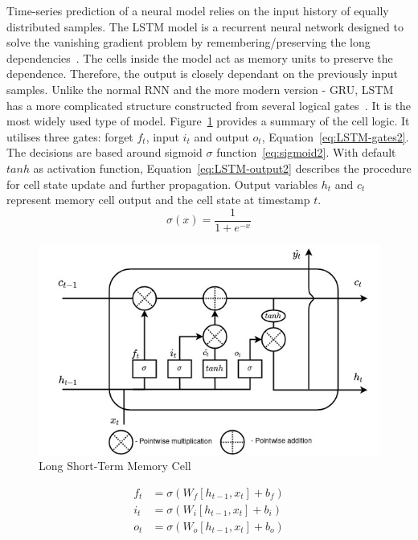 Time-series prediction of a neural model relies on the input history of equally distributed samples.
The LSTM model is a recurrent neural network designed to solve the vanishing gradient problem by remembering/preserving the long dependencies~\cite{rasifaghihi_predictive_2020}.
The cells inside the model act as memory units to preserve the dependence.
Therefore, the output is closely dependant on the previously input samples.
Unlike the normal RNN and the more modern version - GRU, LSTM has a more complicated structure constructed from several logical gates~\cite{LSTM_Hochreiter1997}.
It is the most widely used type of model.
\mbox{Figure~\ref{fig:LSTM-cell2}} provides a summary of the cell logic.
It utilises three gates: forget $f_t$, input $i_t$ and output $o_t$, \mbox{Equation~\ref{eq:LSTM-gates2}}.
The decisions are based around sigmoid $\sigma$ function~\ref{eq:sigmoid2}.
With default $tanh$ as activation function, \mbox{Equation~\ref{eq:LSTM-output2}} describes the procedure for cell state update and further propagation.
Output variables $h_t$ and $c_t$ represent memory cell output and the cell state at timestamp $t$.
\begin{equation}
    \sigma(x) = \frac{1}{1+e^{-x}}
    \label{eq:sigmoid2}
\end{equation}
\begin{figure}[htbp]
    \centering
    \includegraphics[width=\linewidth]{II_Body/LSTM/images/LSTM.jpg}
    \caption{Long Short-Term Memory Cell}
    \label{fig:LSTM-cell2}
\end{figure}
\begin{equation}
    \begin{split}
        f_t &= \sigma \left(W_f \left[h_{t-1}, x_t \right] + b_f \right) \\
        i_t &= \sigma \left(W_i \left[h_{t-1}, x_t \right] + b_i \right) \\
        o_t &= \sigma \left(W_o \left[h_{t-1}, x_t \right] + b_o \right) \\    
    \end{split}
    \label{eq:LSTM-gates2}
\end{equation}
